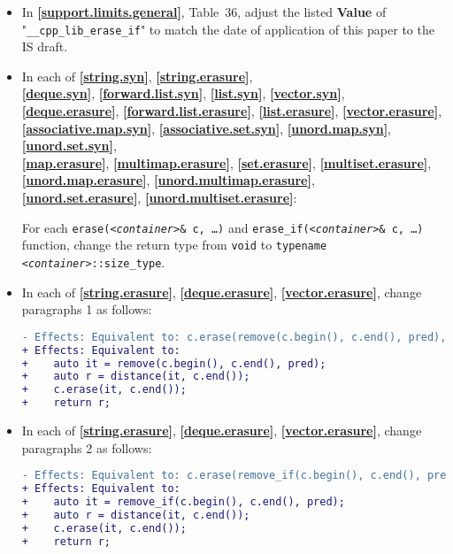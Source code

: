 \documentclass[11pt]{article}
\newcommand{\wgpaper}[1]{\href{https://wg21.link/#1}{#1}}
\newcommand{\isref}[1]{\textbf{[\wgpaper{#1}]}}
\newcommand{\cst}{\texttt{\textit{<container>}::size\_type}}
\begin{document}
\begin{itemize}
\item In \isref{support.limits.general}, Table~36, adjust the listed
  \textbf{Value} of "\texttt{\_\_cpp\_lib\_erase\_if}" to match the
  date of application of this paper to the IS draft.

\item In each of \isref{string.syn},
  \isref{string.erasure},\\ \isref{deque.syn},
  \isref{forward.list.syn}, \isref{list.syn}, \isref{vector.syn},
  \\\isref{deque.erasure}, \isref{forward.list.erasure},
  \isref{list.erasure}, \isref{vector.erasure},\\
  \isref{associative.map.syn}, \isref{associative.set.syn},
  \isref{unord.map.syn}, \isref{unord.set.syn},\\\isref{map.erasure},
  \isref{multimap.erasure}, \isref{set.erasure},
  \isref{multiset.erasure},\\ \isref{unord.map.erasure},
  \isref{unord.multimap.erasure},\\ \isref{unord.set.erasure},
  \isref{unord.multiset.erasure}:
  
For each \texttt{erase(\textit{<container>}\& c, \ldots)} and
\texttt{erase\_if(\textit{<container>}\& c, \ldots)} function, change
the return type from \texttt{void} to \texttt{typename \cst}.

\item In each of \isref{string.erasure}, \isref{deque.erasure},
  \isref{vector.erasure}, change paragraphs 1 as follows:
\begin{lstlisting}[language=diff]
- Effects: Equivalent to: c.erase(remove(c.begin(), c.end(), pred), c.end());
+ Effects: Equivalent to:
+    auto it = remove(c.begin(), c.end(), pred);
+    auto r = distance(it, c.end());
+    c.erase(it, c.end());
+    return r;
\end{lstlisting}

\item In each of \isref{string.erasure}, \isref{deque.erasure},
  \isref{vector.erasure}, change paragraphs 2 as follows:
\begin{lstlisting}[language=diff]
- Effects: Equivalent to: c.erase(remove_if(c.begin(), c.end(), pred), c.end());
+ Effects: Equivalent to:
+    auto it = remove_if(c.begin(), c.end(), pred);
+    auto r = distance(it, c.end());
+    c.erase(it, c.end());
+    return r;
\end{lstlisting}


\end{itemize}
\end{document}
